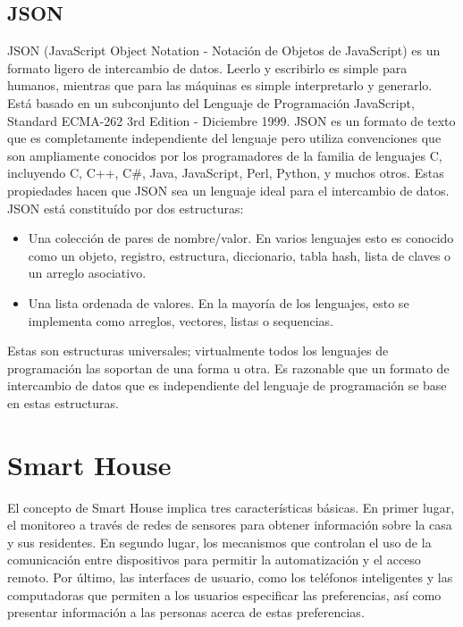 \subsection{JSON}

JSON (JavaScript Object Notation - Notación de Objetos de JavaScript) es un formato ligero de intercambio de datos. Leerlo y escribirlo es simple para humanos, mientras que para las máquinas es simple interpretarlo y generarlo. Está basado en un subconjunto del Lenguaje de Programación JavaScript, Standard ECMA-262 3rd Edition - Diciembre 1999. JSON es un formato de texto que es completamente independiente del lenguaje pero utiliza convenciones que son ampliamente conocidos por los programadores de la familia de lenguajes C, incluyendo C, C++, C\#, Java, JavaScript, Perl, Python, y muchos otros. Estas propiedades hacen que JSON sea un lenguaje ideal para el intercambio de datos.\\

JSON está constituído por dos estructuras:


\begin{itemize}
	\item Una colección de pares de nombre/valor. En varios lenguajes esto es conocido como un objeto, registro, estructura, diccionario, tabla hash, lista de claves o un arreglo asociativo.
	
	\item Una lista ordenada de valores. En la mayoría de los lenguajes, esto se implementa como arreglos, vectores, listas o sequencias.
\end{itemize}

Estas son estructuras universales; virtualmente todos los lenguajes de programación las soportan de una forma u otra. Es razonable que un formato de intercambio de datos que es independiente del lenguaje de programación se base en estas estructuras.


\section{Smart House}

El concepto de Smart House implica tres características básicas. En primer lugar, el monitoreo a través de redes de sensores para obtener información sobre la casa y sus residentes. En segundo lugar, los mecanismos que controlan el uso de la comunicación entre dispositivos para permitir la automatización y el acceso remoto. Por último, las interfaces de usuario, como los teléfonos inteligentes y las computadoras que permiten a los usuarios especificar las preferencias, así como presentar información a las personas acerca de estas preferencias. \\

